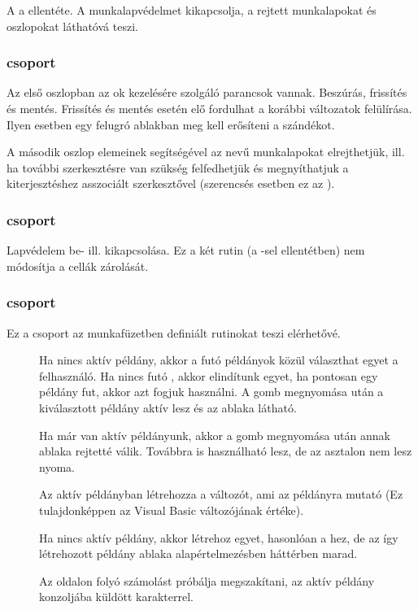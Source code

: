 A  a  ellentéte. A
munkalapvédelmet kikapcsolja, a rejtett munkalapokat és oszlopokat
láthatóvá teszi.

\subsubsection{ csoport} 
Az első oszlopban az ok kezelésére szolgáló parancsok
vannak. Beszúrás, frissítés és mentés. Frissítés és mentés esetén elő
fordulhat a korábbi változatok felülírása. Ilyen esetben 
egy felugró ablakban meg kell erősíteni a szándékot.

A második oszlop elemeinek segítségével az  nevű munkalapokat
elrejthetjük, ill. ha további szerkesztésre van szükség felfedhetjük
és megnyíthatjuk a  kiterjesztéshez asszociált szerkesztővel
(szerencsés esetben ez az ).

\subsubsection{ csoport}
Lapvédelem be- ill. kikapcsolása. Ez a két rutin (a -sel
ellentétben) nem módosítja a cellák zárolását. 

\subsubsection{ csoport}
Ez a csoport az  munkafüzetben definiált rutinokat teszi elérhetővé.
\begin{description}
\item[] Ha nincs aktív  példány,
  akkor a futó   példányok közül választhat egyet a
  felhasználó. Ha nincs futó , 
  akkor elindítunk egyet, ha pontosan egy  példány fut, akkor azt
  fogjuk használni. A gomb megnyomása után a kiválasztott  példány
  aktív lesz és az ablaka látható. 
  
  Ha már van aktív  példányunk,
  akkor a gomb megnyomása után annak ablaka rejtetté válik. Továbbra
  is használható lesz, de az asztalon nem lesz nyoma.

\item[] Az aktív  példányban
  létrehozza a  
  változót, ami az  példányra mutató  (Ez
  tulajdonképpen  az  Visual Basic 
  változójának értéke). 

  Ha nincs aktív  példány, akkor létrehoz egyet, hasonlóan a
  hez, de az így 
  létrehozott  példány ablaka alapértelmezésben háttérben marad.
  
\item[] Az  oldalon folyó számolást próbálja
  megszakítani, az aktív  példány konzoljába küldött
   karakterrel.  
\end{description}

